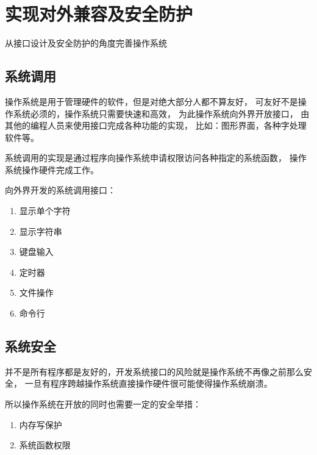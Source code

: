 \chapter{实现对外兼容及安全防护}

从接口设计及安全防护的角度完善操作系统

\section{系统调用}

操作系统是用于管理硬件的软件，但是对绝大部分人都不算友好，
可友好不是操作系统必须的，操作系统只需要快速和高效，
为此操作系统向外界开放接口，
由其他的编程人员来使用接口完成各种功能的实现，
比如：图形界面，各种字处理软件等。

系统调用的实现是通过程序向操作系统申请权限访问各种指定的系统函数，
操作系统操作硬件完成工作。

向外界开发的系统调用接口：
\begin{enumerate}
    \item 显示单个字符
    \item 显示字符串
    \item 键盘输入
    \item 定时器
    \item 文件操作
    \item 命令行
\end{enumerate}

\section{系统安全}

并不是所有程序都是友好的，开发系统接口的风险就是操作系统不再像之前那么安全，
一旦有程序跨越操作系统直接操作硬件很可能使得操作系统崩溃。

所以操作系统在开放的同时也需要一定的安全举措：
\begin{enumerate}
    \item 内存写保护
    \item 系统函数权限
\end{enumerate}